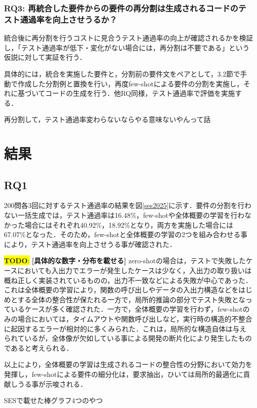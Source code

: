 \documentclass[submit,techrep,noauthor]{ipsj}
\newcommand{\todo}[1]{\colorbox{yellow}{{\bf TODO}:}{\color{red} {\textbf{[#1]}}}}
\begin{document}
\subsubsection{RQ3: 再統合した要件からの要件の再分割は生成されるコードのテスト通過率を向上させうるか？}
統合後に再分割を行うコストに見合うテスト通過率の向上が確認されるかを検証し，「テスト通過率が低下・変化がない場合には，再分割は不要である」という仮説に対して実証を行う．

具体的には，統合を実施した要件と，分割前の要件文をペアとして，3.2節で手動で作成した分割例と置換を行い，再度few-shotによる要件の分割を実施し，それに基づいてコードの生成を行う．他RQ同様，テスト通過率で評価を実施する．

再分割して，テスト通過率変わらないならやる意味ないやんって話

\section{結果}

\subsection{RQ1}
200問各3回に対するテスト通過率の結果を図\ref{ses2025}に示す．要件の分割を行わない一括生成では，テスト通過率は16.48\%，few-shotや全体概要の学習を行わなかった場合にはそれぞれ40.92\%，18.92\%となり，両方を実施した場合には67.07\%となった．そのため，few-shotと全体概要の学習の2つを組み合わせる事により，テスト通過率を向上させうる事が確認された．

\todo{具体的な数字・分布を載せる}
zero-shotの場合は，テストで失敗したケースにおいても入出力でエラーが発生したケースは少なく，入出力の取り扱いは概ね正しく実装されているものの，出力不一致などによる失敗が中心であった．これは全体概要の学習により，関数の呼び出しやデータの入出力構造などをはじめとする全体の整合性が保たれる一方で，局所的推論の部分でテスト失敗となっているケースが多く確認された．一方で，全体概要の学習を行わず，few-shotのみの場合においては，タイムアウトや関数呼び出しなど，実行時の構造的不整合に起因するエラーが相対的に多くみられた．これは，局所的な構造自体は与えられているが，全体像が欠如している事による開発の断片化により発生したものであると考えられる．

以上により，全体概要の学習は生成されるコードの整合性の分野において効力を発揮し，few-shotによる要件の細分化は，要求抽出，ひいては局所的最適化に貢献しうる事が示唆される．

SESで載せた棒グラフ4つのやつ
\end{document}
